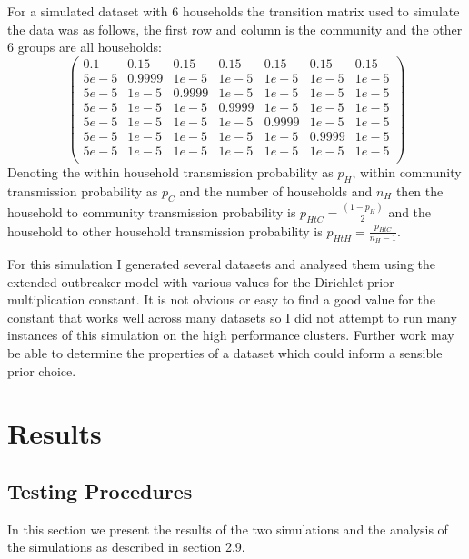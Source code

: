 \documentclass[11pt,a4paper]{report}
\begin{document}
For a simulated dataset with 6 households the transition matrix used to simulate the data was as follows, the first row and column is the community and the other 6 groups are all households:
\[\begin{pmatrix}
0.1 & 0.15 & 0.15 & 0.15 & 0.15 & 0.15 & 0.15 \\
5e-5 & 0.9999 & 1e-5 & 1e-5 & 1e-5 & 1e-5 & 1e-5 \\
5e-5 & 1e-5 & 0.9999 & 1e-5 & 1e-5 & 1e-5 & 1e-5\\
5e-5 & 1e-5 & 1e-5 & 0.9999 & 1e-5 & 1e-5 & 1e-5\\
5e-5 & 1e-5 & 1e-5 & 1e-5 & 0.9999 & 1e-5 & 1e-5\\
5e-5 & 1e-5 & 1e-5 & 1e-5 & 1e-5 & 0.9999 & 1e-5\\
5e-5 & 1e-5 & 1e-5 & 1e-5 & 1e-5 & 1e-5 & 1e-5\\
\end{pmatrix}\]
Denoting the within household transmission probability as $p_{H}$, within community transmission probability as $p_{C}$ and the number of households and $n_{H}$ then the household to community transmission probability is $p_{HtC} = \frac{(1-p_{H})}{2}$ and the household to other household transmission probability is $p_{HtH} = \frac{p_{HtC}}{n_{H} - 1}$.

For this simulation I generated several datasets and analysed them using the extended outbreaker model with various values for the Dirichlet prior multiplication constant. It is not obvious or easy to find a good value for the constant that works well across many datasets so I did not attempt to run many instances of this simulation on the high performance clusters. Further work may be able to determine the properties of a dataset which could inform a sensible prior choice.



\chapter{Results}
\section{Testing Procedures}
In this section we present the results of the two simulations and the analysis of the simulations as described in section 2.9.
\end{document}
